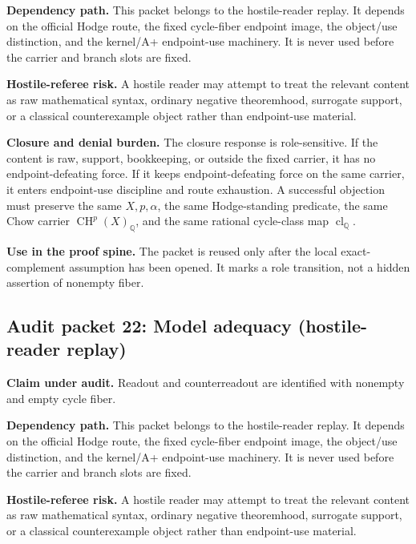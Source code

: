 \documentclass[11pt]{article}
\newcommand{\QQ}{\mathbb{Q}}
\newcommand{\CH}{\operatorname{CH}}
\newcommand{\clQ}{\operatorname{cl}_{\QQ}}
\begin{document}
\par\noindent\textbf{Dependency path.} This packet belongs to the hostile-reader replay. It depends on the official Hodge route, the fixed cycle-fiber endpoint image, the object/use distinction, and the kernel/A+ endpoint-use machinery. It is never used before the carrier and branch slots are fixed.


\par\noindent\textbf{Hostile-referee risk.} A hostile reader may attempt to treat the relevant content as raw mathematical syntax, ordinary negative theoremhood, surrogate support, or a classical counterexample object rather than endpoint-use material.


\par\noindent\textbf{Closure and denial burden.} The closure response is role-sensitive. If the content is raw, support, bookkeeping, or outside the fixed carrier, it has no endpoint-defeating force. If it keeps endpoint-defeating force on the same carrier, it enters endpoint-use discipline and route exhaustion. A successful objection must preserve the same $X,p,\alpha$, the same Hodge-standing predicate, the same Chow carrier $\CH^p(X)_\QQ$, and the same rational cycle-class map $\clQ$.


\par\noindent\textbf{Use in the proof spine.} The packet is reused only after the local exact-complement assumption has been opened. It marks a role transition, not a hidden assertion of nonempty fiber.


\subsection{Audit packet 22: Model adequacy (hostile-reader replay)}


\par\noindent\textbf{Claim under audit.} Readout and counterreadout are identified with nonempty and empty cycle fiber.


\par\noindent\textbf{Dependency path.} This packet belongs to the hostile-reader replay. It depends on the official Hodge route, the fixed cycle-fiber endpoint image, the object/use distinction, and the kernel/A+ endpoint-use machinery. It is never used before the carrier and branch slots are fixed.


\par\noindent\textbf{Hostile-referee risk.} A hostile reader may attempt to treat the relevant content as raw mathematical syntax, ordinary negative theoremhood, surrogate support, or a classical counterexample object rather than endpoint-use material.
\end{document}
